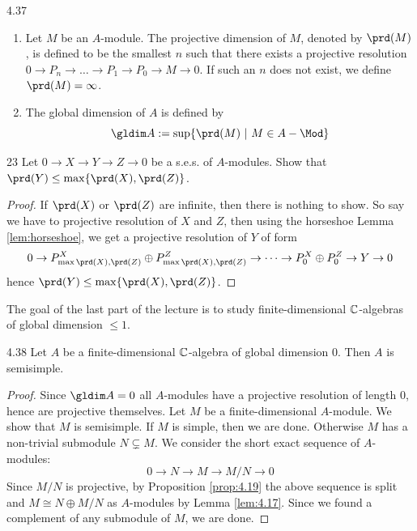 \documentclass[twoside = false,	%
		headsepline,		%
		parskip = true,
		]{scrbook}						%
\begin{document}
    \begin{definition}{}{4.37}
        \begin{enumerate}
            \item Let $M$ be an $A$-module. The projective dimension of $M$, denoted by $\prd(M)$, is defined to be the smallest $n$ such that there exists a projective resolution $0 \to P_n \to \dots \to P_1 \to P_0 \to M \to 0$. If such an $n$ does not exist, we define $\prd(M) = \infty$.
            \item The global dimension of $A$ is defined by
            \begin{equation*}
                \gldim A := \sup \{\prd (M) \ | \ M \in A-\Mod\}
            \end{equation*}
        \end{enumerate}
    \end{definition}

    \begin{exercise}{}{23}
        Let $0 \to X \to Y \to Z \to 0$ be a s.e.s. of $A$-modules. Show that $\prd(Y) \leq \max\{\prd(X),\prd(Z)\}$.
    \end{exercise}

    \begin{proof}
        If $\prd(X)$ or $\prd(Z)$ are infinite, then there is nothing to show. So say we have to projective resolution of $X$ and $Z$, then using the horseshoe Lemma \ref{lem:horseshoe}, we get a projective resolution of $Y$ of form
        \begin{equation*}
            0 \to P^X_{\max{\prd(X),\prd(Z)}} \oplus P^Z_{\max{\prd(X),\prd(Z)}} \to \dots \to P^X_0 \oplus P^Z_0 \to Y \to 0
        \end{equation*}
        hence $\prd(Y) \leq \max\{\prd(X),\prd(Z)\}$.
    \end{proof}
    
    The goal of the last part of the lecture is to study finite-dimensional $\mathbb C$-algebras of global dimension $\leq 1$.

    \begin{proposition}{}{4.38}
        Let $A$ be a finite-dimensional $\mathbb C$-algebra of global dimension $0$. Then $A$ is semisimple.
    \end{proposition}

    \begin{proof}
        Since $\gldim A = 0$ all $A$-modules have a projective resolution of length $0$, hence are projective themselves. Let $M$ be a finite-dimensional $A$-module. We show that $M$ is semisimple. If $M$ is simple, then we are done. Otherwise $M$ has a non-trivial submodule $N \subsetneq M$. We consider the short exact sequence of $A$-modules:
        \begin{equation*}
            0 \to N \to M \to M/N \to 0
        \end{equation*}
        Since $M/N$ is projective, by Proposition \ref{prop:4.19} the above sequence is split and $M \cong N \oplus M/N$ as $A$-modules by Lemma \ref{lem:4.17}. Since we found a complement of any submodule of $M$, we are done.
    \end{proof}
    
\end{document}
